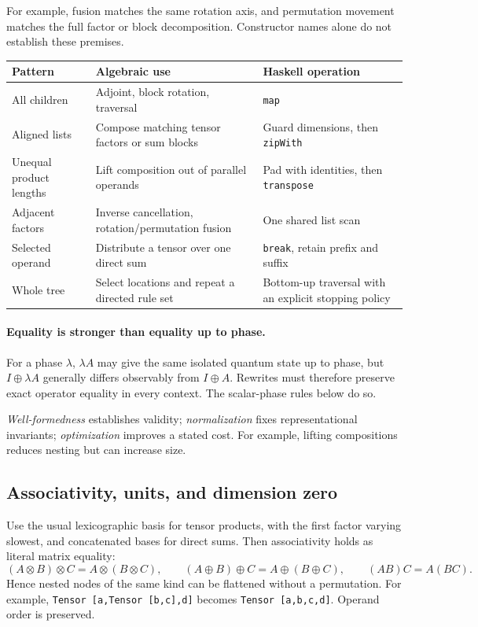 \documentclass[11pt,a4paper]{article}
\newcommand{\code}[1]{\texttt{#1}}
\begin{document}
For example, fusion matches the same rotation axis, and permutation
movement matches the full factor or block decomposition. Constructor
names alone do not establish these premises.

\begin{center}
\begin{tabularx}{\linewidth}{@{}lLL@{}}
\toprule
Pattern & Algebraic use & Haskell operation\\
\midrule
All children & Adjoint, block rotation, traversal & \code{map}\\
Aligned lists & Compose matching tensor factors or sum blocks & Guard dimensions, then \code{zipWith}\\
Unequal product lengths & Lift composition out of parallel operands & Pad with identities, then \code{transpose}\\
Adjacent factors & Inverse cancellation, rotation/permutation fusion & One shared list scan\\
Selected operand & Distribute a tensor over one direct sum & \code{break}, retain prefix and suffix\\
Whole tree & Select locations and repeat a directed rule set & Bottom-up traversal with an explicit stopping policy\\
\bottomrule
\end{tabularx}
\end{center}

\paragraph{Equality is stronger than equality up to phase.}
For a phase $\lambda$, $\lambda A$ may give the same isolated quantum
state up to phase, but $I\oplus\lambda A$ generally differs observably
from $I\oplus A$. Rewrites must therefore preserve exact operator
equality in every context. The scalar-phase rules below do so.

\emph{Well-formedness} establishes validity; \emph{normalization} fixes
representational invariants; \emph{optimization} improves a stated cost.
For example, lifting compositions reduces nesting but can increase size.

\subsection{Associativity, units, and dimension zero}

Use the usual lexicographic basis for tensor products, with the first
factor varying slowest, and concatenated bases for direct sums. Then
associativity holds as literal matrix equality:
\[
 (A\otimes B)\otimes C=A\otimes(B\otimes C),\qquad
 (A\oplus B)\oplus C=A\oplus(B\oplus C),\qquad
 (AB)C=A(BC).
\]
Hence nested nodes of the same kind can be flattened without a
permutation. For example, \code{Tensor [a,Tensor [b,c],d]} becomes
\code{Tensor [a,b,c,d]}. Operand order is preserved.
\end{document}
